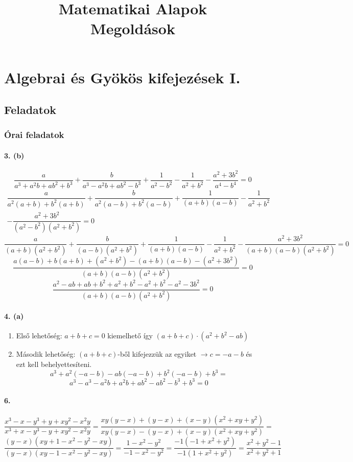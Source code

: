 \documentclass[12pt,a4paper,fleqn]{article}
\author{}
\title{Matematikai Alapok \\ \textbf{Megoldások}}
\newcommand{\myparagraph}[1]{\paragraph{#1}\mbox{}}
\begin{document}
\maketitle
\thispagestyle{empty}
\clearpage

\section{Algebrai és Gyökös kifejezések I.}
\setcounter{subsection}{1}
\subsection{Feladatok}
\subsubsection{Órai feladatok}

\myparagraph{3. (b)}
\[
  \dfrac{a}{a^3+a^2b+ab^2+b^3} + \dfrac{b}{a^3-a^2b+ab^2-b^3} + \dfrac{1}{a^2-b^2} -
  \dfrac{1}{a^2+b^2} - \dfrac{a^2+3b^2}{a^4-b^4} = 0
\]
\begin{eqnarray*}
  \dfrac{a}{a^2(a+b)+b^2(a+b)} + \dfrac{b}{a^2(a-b)+b^2(a-b)} + \dfrac{1}{(a+b)(a-b)} -
  \dfrac{1}{a^2+b^2} \\
  - \dfrac{a^2+3b^2}{(a^2-b^2)(a^2+b^2)} = 0
\end{eqnarray*}
\[ \dfrac{a}{(a+b)(a^2+b^2)} + \dfrac{b}{(a-b)(a^2+b^2)} + \dfrac{1}{(a+b)(a-b)} -
    \dfrac{1}{a^2+b^2} - \dfrac{a^2+3b^2}{(a+b)(a-b)(a^2+b^2)} = 0 \]
\[ \dfrac{a(a-b)+b(a+b)+(a^2+b^2)-(a+b)(a-b)-(a^2+3b^2)}{(a+b)(a-b)(a^2+b^2)} = 0 \]
\[ \dfrac{a^2-ab+ab+b^2+a^2+b^2-a^2+b^2-a^2-3b^2}{(a+b)(a-b)(a^2+b^2)} = 0 \]

\myparagraph{4. (a)}
\begin{enumerate}
  \item Első lehetőség: $a+b+c=0$ kiemelhető így $(a+b+c) \cdot (a^2+b^2-ab)$
  \item Második lehetőség: $(a+b+c)$-ből kifejezzük az egyiket
    $\rightarrow c = -a - b$ és ezt kell behelyettesíteni.
  \[ a^3 + a^2(-a-b) -ab(-a-b) + b^2(-a-b) + b^3 = \]
  \[ a^3 - a^3 - a^2b + a^2b +ab^2 - ab^2 - b^3 + b^3 = 0 \]
\end{enumerate}

\myparagraph{6.}
\[ \dfrac{x^3-x-y^3+y+xy^2-x^2y}{x^3+x-y^3-y+xy^2-x^2y} =
  \dfrac{xy(y-x)+(y-x)+(x-y)(x^2+xy+y^2)}{xy(y-x)-(y-x)+(x-y)(x^2+xy+y^2)} = \]
\[
  \dfrac{(y-x)(xy+1-x^2-y^2-xy)}{(y-x)(xy-1-x^2-y^2-xy)} =
  \dfrac{1-x^2-y^2}{-1-x^2-y^2} = \dfrac{-1(-1+x^2+y^2)}{-1(1+x^2+y^2)} =
  \dfrac{x^2+y^2-1}{x^2+y^2+1}
\]
\end{document}
